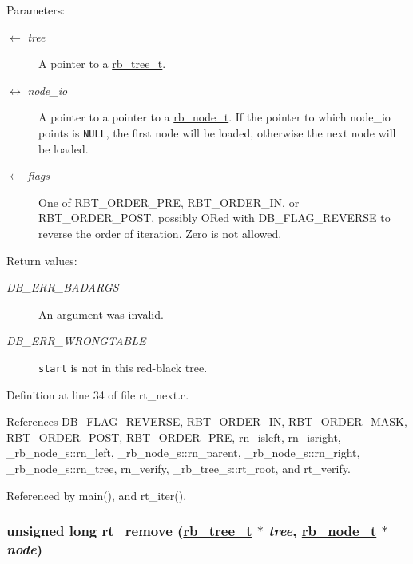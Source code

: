 \begin{Desc}
\item[Parameters:]
\begin{description}
\item[\mbox{$\leftarrow$} {\em tree}]A pointer to a \hyperlink{group__dbprim__rbtree_ga0}{rb\_\-tree\_\-t}. \item[\mbox{$\leftrightarrow$} {\em node\_\-io}]A pointer to a pointer to a \hyperlink{group__dbprim__rbtree_ga1}{rb\_\-node\_\-t}. If the pointer to which node\_\-io points is {\tt NULL}, the first node will be loaded, otherwise the next node will be loaded. \item[\mbox{$\leftarrow$} {\em flags}]One of RBT\_\-ORDER\_\-PRE, RBT\_\-ORDER\_\-IN, or RBT\_\-ORDER\_\-POST, possibly ORed with DB\_\-FLAG\_\-REVERSE to reverse the order of iteration. Zero is not allowed.\end{description}
\end{Desc}
\begin{Desc}
\item[Return values:]
\begin{description}
\item[{\em DB\_\-ERR\_\-BADARGS}]An argument was invalid. \item[{\em DB\_\-ERR\_\-WRONGTABLE}]{\tt start} is not in this red-black tree.\end{description}
\end{Desc}


Definition at line 34 of file rt\_\-next.c.

References DB\_\-FLAG\_\-REVERSE, RBT\_\-ORDER\_\-IN, RBT\_\-ORDER\_\-MASK, RBT\_\-ORDER\_\-POST, RBT\_\-ORDER\_\-PRE, rn\_\-isleft, rn\_\-isright, \_\-rb\_\-node\_\-s::rn\_\-left, \_\-rb\_\-node\_\-s::rn\_\-parent, \_\-rb\_\-node\_\-s::rn\_\-right, \_\-rb\_\-node\_\-s::rn\_\-tree, rn\_\-verify, \_\-rb\_\-tree\_\-s::rt\_\-root, and rt\_\-verify.

Referenced by main(), and rt\_\-iter().\hypertarget{group__dbprim__rbtree_ga8}{
\subsubsection[rt\_\-remove]{\setlength{\rightskip}{0pt plus 5cm}unsigned long rt\_\-remove (\hyperlink{struct__rb__tree__s}{rb\_\-tree\_\-t} $\ast$ {\em tree}, \hyperlink{struct__rb__node__s}{rb\_\-node\_\-t} $\ast$ {\em node})}}
\label{group__dbprim__rbtree_ga8}


